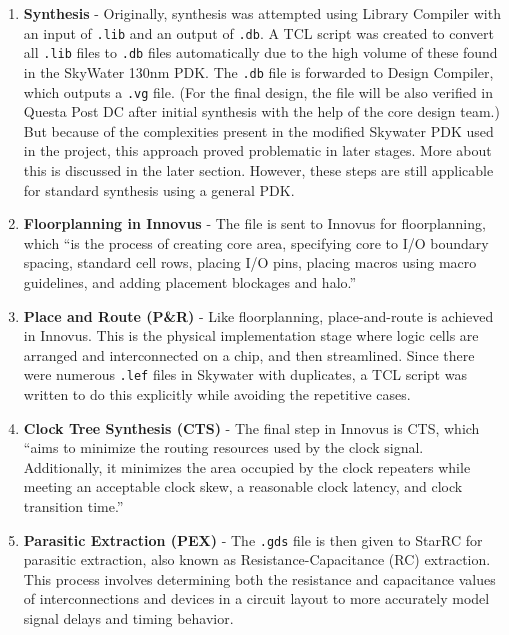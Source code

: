 \documentclass[conference]{IEEEtran}
\begin{document}
\begin{enumerate}
    \item \textbf{Synthesis} - Originally, synthesis was attempted using Library Compiler with an input of \texttt{.lib} and an output of \texttt{.db}. A TCL script was created to convert all \texttt{.lib} files to \texttt{.db} files automatically due to the high volume of these found in the SkyWater 130nm PDK. The \texttt{.db} file is forwarded to Design Compiler, which outputs a \texttt{.vg} file. (For the final design, the file will be also verified in Questa Post DC after initial synthesis with the help of the core design team.) But because of the complexities present in the modified Skywater PDK used in the project, this approach proved problematic in later stages. More about this is discussed in the later section. However, these steps are still applicable for standard synthesis using a general PDK.
    
    \item \textbf{Floorplanning in Innovus} - The file is sent to Innovus for floorplanning, which “is the process of creating core area, specifying core to I/O boundary spacing, standard cell rows, placing I/O pins, placing macros using macro guidelines, and adding placement blockages and halo.” \cite{b4}
    
    \item \textbf{Place and Route (P\&R)} - Like floorplanning, place-and-route is achieved in Innovus. This is the physical implementation stage where logic cells are arranged and interconnected on a chip, and then streamlined. Since there were numerous \texttt{.lef} files in Skywater with duplicates, a TCL script was written to do this explicitly while avoiding the repetitive cases.

    \item \textbf{Clock Tree Synthesis (CTS)} - The final step in Innovus is CTS, which “aims to minimize the routing resources used by the clock signal. Additionally, it minimizes the area occupied by the clock repeaters while meeting an acceptable clock skew, a reasonable clock latency, and clock transition time.” \cite{b5}
    
    \item \textbf{Parasitic Extraction (PEX)} - The \texttt{.gds} file is then given to StarRC for parasitic extraction, also known as Resistance-Capacitance (RC) extraction. This process involves determining both the resistance and capacitance values of interconnections and devices in a circuit layout to more accurately model signal delays and timing behavior.


\end{enumerate}
\end{document}
